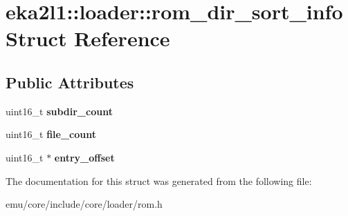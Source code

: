\hypertarget{structeka2l1_1_1loader_1_1rom__dir__sort__info}{}\section{eka2l1\+:\+:loader\+:\+:rom\+\_\+dir\+\_\+sort\+\_\+info Struct Reference}
\label{structeka2l1_1_1loader_1_1rom__dir__sort__info}
\subsection*{Public Attributes}
\begin{DoxyCompactItemize}
\item 
\mbox{\label{structeka2l1_1_1loader_1_1rom__dir__sort__info_ae88c0725c65a3823df614dd0445c9f18}} 
uint16\+\_\+t {\bfseries subdir\+\_\+count}
\item 
\mbox{\label{structeka2l1_1_1loader_1_1rom__dir__sort__info_abaf0435260791e4dd86c1b09f485e201}} 
uint16\+\_\+t {\bfseries file\+\_\+count}
\item 
\mbox{\label{structeka2l1_1_1loader_1_1rom__dir__sort__info_a223f7ee643ced8e53b54732d9e25bfde}} 
uint16\+\_\+t $\ast$ {\bfseries entry\+\_\+offset}
\end{DoxyCompactItemize}


The documentation for this struct was generated from the following file\+:\begin{DoxyCompactItemize}
\item 
emu/core/include/core/loader/rom.\+h\end{DoxyCompactItemize}
